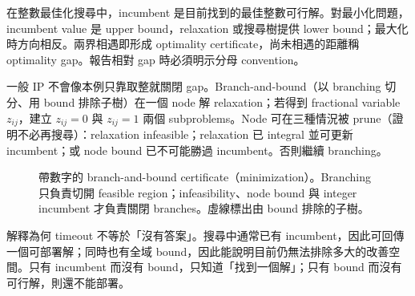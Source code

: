 \documentclass[11pt,a4paper,oneside,openany]{book}
\begin{document}
\begin{definition}
在整數最佳化搜尋中，incumbent 是目前找到的最佳整數可行解。對最小化問題，incumbent value 是 upper bound，relaxation 或搜尋樹提供 lower bound；最大化時方向相反。兩界相遇即形成 optimality certificate，尚未相遇的距離稱 optimality gap。報告相對 gap 時必須明示分母 convention。
\end{definition}

一般 IP 不會像本例只靠取整就關閉 gap。Branch-and-bound（以 branching 切分、用 bound 排除子樹）在一個 node 解 relaxation；若得到 fractional variable $z_{ij}$，建立 $z_{ij}=0$ 與 $z_{ij}=1$ 兩個 subproblems。Node 可在三種情況被 prune（證明不必再搜尋）：relaxation infeasible；relaxation 已 integral 並可更新 incumbent；或 node bound 已不可能勝過 incumbent。否則繼續 branching。

\begin{figure}[htbp]
\centering
{}
\caption{帶數字的 branch-and-bound certificate（minimization）。Branching 只負責切開 feasible region；infeasibility、node bound 與 integer incumbent 才負責關閉 branches。虛線標出由 bound 排除的子樹。}
\label{fig:branch-bound}
\end{figure}

 解釋為何 timeout 不等於「沒有答案」。搜尋中通常已有 incumbent，因此可回傳一個可部署解；同時也有全域 bound，因此能說明目前仍無法排除多大的改善空間。只有 incumbent 而沒有 bound，只知道「找到一個解」；只有 bound 而沒有可行解，則還不能部署。
\end{document}

